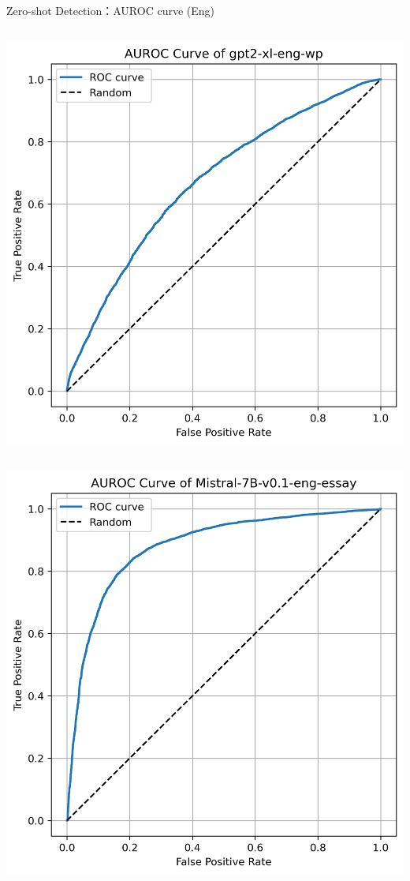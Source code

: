 \documentclass[serif]{beamer}
\begin{document}
\begin{frame}{Zero-shot Detection：AUROC curve (Eng)}
\begin{columns}[t]
    \centering
    \includegraphics[width=\linewidth]{images/gpt2-xl-eng-wp.png}
\end{columns}

\vspace{0.3cm}

\begin{columns}[t]
    \centering
    \includegraphics[width=\linewidth]{images/Mistral-7B-v0.1-eng-essay.png}


\end{columns}
\end{frame}
\end{document}
